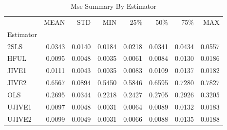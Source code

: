 \begin{table}[ht]
\centering
\caption{Mse Summary By Estimator}
\begin{tabular}{lrrrrrrr}
\toprule
 & MEAN & STD & MIN & 25\% & 50\% & 75\% & MAX \\
Estimator &  &  &  &  &  &  &  \\
\midrule
2SLS & 0.0343 & 0.0140 & 0.0184 & 0.0218 & 0.0341 & 0.0434 & 0.0557 \\
HFUL & 0.0095 & 0.0048 & 0.0035 & 0.0061 & 0.0084 & 0.0130 & 0.0186 \\
JIVE1 & 0.0111 & 0.0043 & 0.0035 & 0.0083 & 0.0109 & 0.0137 & 0.0182 \\
JIVE2 & 0.6567 & 0.0894 & 0.5450 & 0.5846 & 0.6595 & 0.7280 & 0.7827 \\
OLS & 0.2695 & 0.0344 & 0.2218 & 0.2427 & 0.2705 & 0.2926 & 0.3205 \\
UJIVE1 & 0.0097 & 0.0048 & 0.0031 & 0.0064 & 0.0089 & 0.0132 & 0.0183 \\
UJIVE2 & 0.0099 & 0.0049 & 0.0031 & 0.0066 & 0.0088 & 0.0135 & 0.0188 \\
\bottomrule
\end{tabular}
\end{table}
